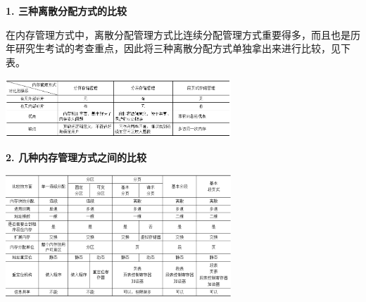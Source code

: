 {\textbf{1. 三种离散分配方式的比较}}

在内存管理方式中，离散分配管理方式比连续分配管理方式重要得多，而且也是历年研究生考试的考查重点，因此将三种离散分配方式单独拿出来进行比较，见下表。

\includegraphics[width=3.33333in,height=0.86458in]{png-jpeg-pics/74DB87F60323C7B2370478B20D9E3968.png}

\textbf{{2. 几种内存管理方式之间的比较}}

\includegraphics[width=3.33333in,height=1.80208in]{png-jpeg-pics/87FB39189D2C90C64F4D1EBEAF5127FE.png}
